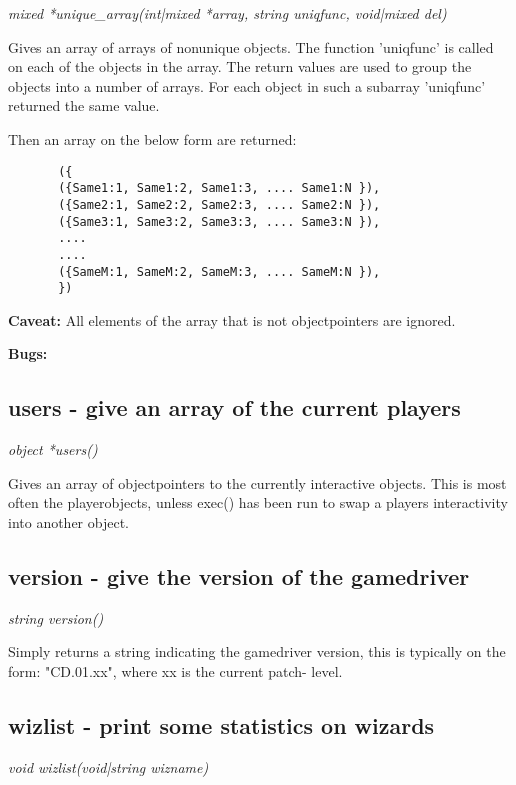     {\em mixed *unique\_array(int|mixed *array, string uniqfunc, void|mixed del)}

    Gives an array of arrays of nonunique objects. The function 'uniqfunc'
    is called on each of the objects in the array. The return values are
    used to group the objects into a number of arrays. For each object
    in such a subarray 'uniqfunc' returned the same value.

    Then an array on the below form are returned:
   
   \begin{verbatim}
       ({
       ({Same1:1, Same1:2, Same1:3, .... Same1:N }),
       ({Same2:1, Same2:2, Same2:3, .... Same2:N }),
       ({Same3:1, Same3:2, Same3:3, .... Same3:N }),
       ....
       ....
       ({SameM:1, SameM:2, SameM:3, .... SameM:N }),
       })
    \end{verbatim}
   
    {\bf Caveat: }  All elements of the array that is not objectpointers are ignored.

    {\bf Bugs: }

\subsection{users - give an array of the current players}

    {\em object *users()}

    Gives an array of objectpointers to the currently interactive
    objects. This is most often the playerobjects, unless exec() has
    been run to swap a players interactivity into another object.   



\subsection{version - give the version of the gamedriver}

    {\em string version()}

    Simply returns a string indicating the gamedriver version, this is
    typically on the form: "CD.01.xx", where xx is the current patch-
    level.


\subsection{wizlist - print some statistics on wizards}

    {\em void wizlist(void|string wizname)}


